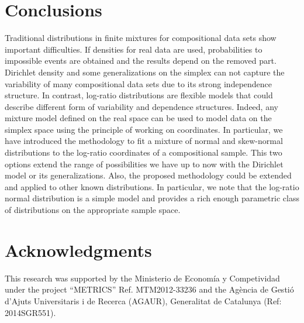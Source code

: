 \documentclass[12pt, a4paper]{article}
\newtheorem{prop}{Proposition}
\begin{document}
\section{Conclusions}
\label{conclusion_section}
Traditional distributions in finite mixtures for compositional data sets show important difficulties. If densities for real data are used, probabilities to impossible events are obtained and the results depend on the removed part. Dirichlet density and some generalizations on the simplex can not capture the variability of many compositional data sets due to its strong independence structure. In contrast, log-ratio distributions are flexible models that could describe different form of variability and dependence structures. Indeed, any mixture model defined on the real space can be used to model data on the simplex space using the principle of working on coordinates. In particular, we have introduced the methodology to fit a mixture of normal and skew-normal distributions to the log-ratio coordinates of a compositional sample.  This two options extend the range of possibilities we have up to now with the Dirichlet model or its generalizations. Also, the proposed methodology could be extended and applied to other known distributions. In particular, we note that the log-ratio normal distribution is a simple model and provides a rich enough parametric class of distributions on the appropriate sample space. 

\section*{Acknowledgments}
This research was supported by the Ministerio de Econom\'ia y Competividad under the project
``METRICS'' Ref. MTM2012-33236 and the Agència de Gestió d'Ajuts Universitaris i de Recerca (AGAUR), Generalitat de Catalunya (Ref: 2014SGR551).



{}


% 
\end{document}
